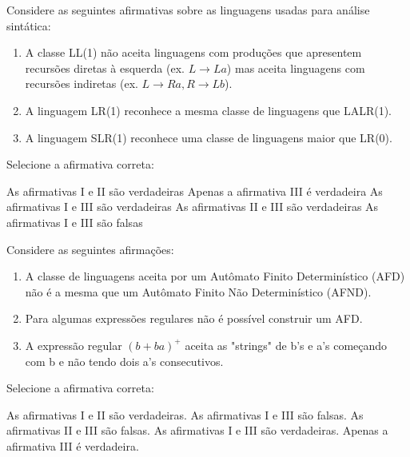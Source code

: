 \documentclass[12pt, addpoints]{exam}
\begin{document}
\begin{questions}
\question

Considere as seguintes afirmativas sobre as linguagens usadas para análise sintática:

\begin{enumerate}[label=\Roman*.]

    \item A classe LL(1) não aceita linguagens com produções que apresentem recursões diretas à esquerda (ex. \(L \rightarrow La\)) mas aceita linguagens com recursões indiretas (ex. \(L \rightarrow Ra, R \rightarrow Lb\)).

    \item A linguagem LR(1) reconhece a mesma classe de linguagens que LALR(1).

    \item A linguagem SLR(1) reconhece uma classe de linguagens maior que LR(0).

\end{enumerate}

Selecione a afirmativa correta:
\begin{choices}
\choice As afirmativas I e II são verdadeiras
\choice Apenas a afirmativa III é verdadeira
\choice As afirmativas I e III são verdadeiras
\choice As afirmativas II e III são verdadeiras
\choice As afirmativas I e III são falsas
\end{choices}

\question

Considere as seguintes afirmações:

\begin{enumerate}[label=\Roman*.]

    \item A classe de linguagens aceita por um Autômato Finito Determinístico (AFD) não é a mesma que um Autômato Finito Não Determinístico (AFND).

    \item Para algumas expressões regulares não é possível construir um AFD.

    \item A expressão regular \((b + ba)^+\) aceita as "strings" de b's e a's começando com b e não tendo dois a's consecutivos.

\end{enumerate}

Selecione a afirmativa correta:
\begin{choices}
\choice As afirmativas I e II são verdadeiras.
\choice As afirmativas I e III são falsas.
\choice As afirmativas II e III são falsas.
\choice As afirmativas I e III são verdadeiras.
\choice Apenas a afirmativa III é verdadeira.
\end{choices}


\end{questions}
\end{document}
